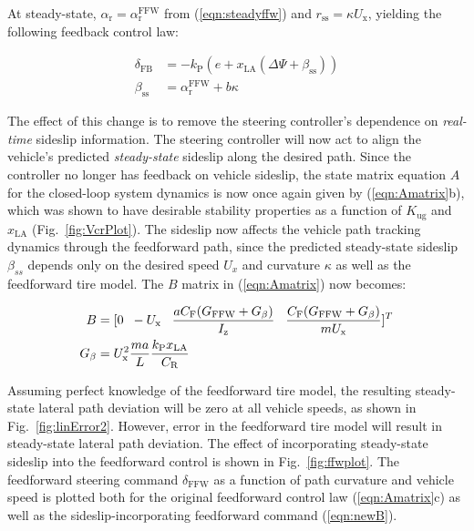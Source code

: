 \documentclass{nVSD2e}
\theoremstyle{plain}
\theoremstyle{definition}
\theoremstyle{remark}
\begin{document}
At steady-state, $\alpha_\mathrm{r}=\alpha_\mathrm{r}^\mathrm{FFW}$ from (\ref{eqn:steadyffw}) and $r_\mathrm{ss}=\kappa U_\mathrm{x}$, yielding the following feedback control law:

\begin{subequations}
\begin{align}
\label{eqn:betass}
\delta_\mathrm{FB} &=-k_\mathrm{P} (e+x_\mathrm{LA} (\Delta\Psi+\beta_\mathrm{ss})) \\
\beta_\mathrm{ss}  &= \alpha_\mathrm{r}^\mathrm{FFW} + b\kappa
\end{align}
\end{subequations}

The effect of this change is to remove the steering controller's dependence on \textit{real-time} sideslip information. The steering
controller will now act to align the vehicle's predicted \textit{steady-state} sideslip along the desired path. Since the controller no
longer has feedback on vehicle sideslip, the state matrix equation $A$ for the closed-loop system dynamics is now 
once again given by (\ref{eqn:Amatrix}b), which was shown to have desirable stability
properties as a function of $K_\mathrm{ug}$ and $x_\mathrm{LA}$ (Fig.~\ref{fig:VcrPlot}). The sideslip now affects the vehicle
path tracking dynamics through the feedforward path, since the predicted steady-state sideslip $\beta_{ss}$ depends only on the
desired speed $U_x$ and curvature $\kappa$ as well as the feedforward tire model. The $B$ matrix in (\ref{eqn:Amatrix}) now becomes: 

\begin{subequations}
\label{eqn:newB}
\begin{align}
	B &=[0 \hspace{2 mm} -U_\mathrm{x} \hspace{3 mm} \frac{a C_\mathrm{F} (G_\mathrm{FFW}+G_\beta)}{I_\mathrm{z}} \hspace{3 mm}  \frac{C_\mathrm{F} (G_\mathrm{FFW}+G_\beta)}{mU_\mathrm{x}}]^T \\
	G_\beta &= U_\mathrm{x}^2\frac{ma}{L}\frac{k_\mathrm{P}x_\mathrm{LA}}{C_\mathrm{R}}
\end{align}
\end{subequations}

Assuming perfect knowledge of the feedforward tire model, the resulting steady-state lateral path deviation will be zero at all vehicle speeds,
as shown in Fig.~\ref{fig:linError2}. However, error in the feedforward tire model will result in steady-state lateral path deviation.
The effect of incorporating steady-state sideslip into the feedforward control is shown in Fig.~\ref{fig:ffwplot}. The feedforward
steering command $\delta_\mathrm{FFW}$ as a function of path curvature and vehicle speed is plotted both for the original feedforward control law (\ref{eqn:Amatrix}c) as well as the sideslip-incorporating
feedforward command (\ref{eqn:newB}). 
\end{document}
